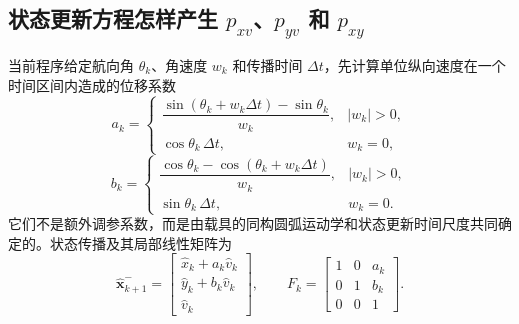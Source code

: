 \documentclass[UTF8,a4paper,11pt]{ctexart}
\newcommand{\prior}{^{-}}
\begin{document}
\subsection{状态更新方程怎样产生 \texorpdfstring{$p_{xv}$、$p_{yv}$ 和 $p_{xy}$}{pxv, pyv and pxy}}

当前程序给定航向角 $\theta_k$、角速度 $w_k$ 和传播时间 $\Delta t$，先计算单位纵向速度在一个时间区间内造成的位移系数
\begin{equation}
a_k=
\begin{cases}
\dfrac{\sin(\theta_k+w_k\Delta t)-\sin\theta_k}{w_k},&|w_k|>0,\\[1.1ex]
\cos\theta_k\,\Delta t,&w_k=0,
\end{cases}
\end{equation}
\begin{equation}
b_k=
\begin{cases}
\dfrac{\cos\theta_k-\cos(\theta_k+w_k\Delta t)}{w_k},&|w_k|>0,\\[1.1ex]
\sin\theta_k\,\Delta t,&w_k=0.
\end{cases}
\end{equation}
它们不是额外调参系数，而是由载具的同构圆弧运动学和状态更新时间尺度共同确定的。状态传播及其局部线性矩阵为
\begin{equation}
\hat{\bm x}_{k+1}\prior=
\begin{bmatrix}
\hat x_k+a_k\hat v_k\\
\hat y_k+b_k\hat v_k\\
\hat v_k
\end{bmatrix},
\qquad
F_k=
\begin{bmatrix}
1&0&a_k\\
0&1&b_k\\
0&0&1
\end{bmatrix}.
\end{equation}
\end{document}
